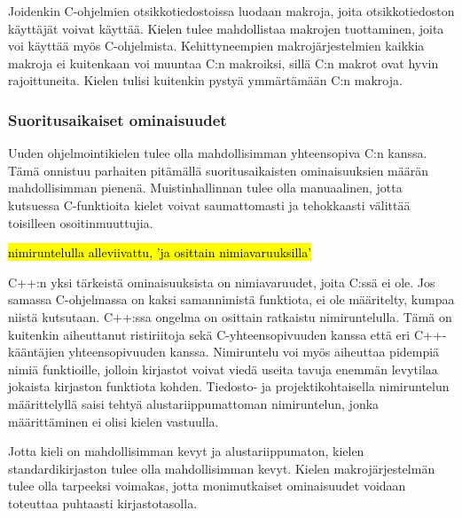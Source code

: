 Joidenkin C-ohjelmien otsikkotiedostoissa luodaan makroja, joita
otsikkotiedoston käyttäjät voivat käyttää. Kielen tulee mahdollistaa makrojen
tuottaminen, joita voi käyttää myös C-ohjelmista. Kehittyneempien
makrojärjestelmien kaikkia makroja ei kuitenkaan voi muuntaa C:n makroiksi,
sillä C:n makrot ovat hyvin rajoittuneita. Kielen tulisi kuitenkin pystyä
ymmärtämään C:n makroja.

\subsubsection{Suoritusaikaiset ominaisuudet}

Uuden ohjelmointikielen tulee olla mahdollisimman yhteensopiva C:n kanssa. Tämä
onnistuu parhaiten pitämällä suoritusaikaisten ominaisuuksien määrän mahdollisimman
pienenä. Muistinhallinnan tulee olla manuaalinen, jotta kutsuessa C-funktioita
kielet voivat saumattomasti ja tehokkaasti välittää toisilleen
osoitinmuuttujia.


\hl{nimiruntelulla alleviivattu, 'ja osittain nimiavaruuksilla'}

C++:n yksi tärkeistä ominaisuuksista on nimiavaruudet, joita C:ssä ei ole. Jos
samassa C-ohjelmassa on kaksi samannimistä funktiota, ei ole määritelty, kumpaa
niistä kutsutaan. C++:ssa ongelma on osittain ratkaistu nimiruntelulla. Tämä on
kuitenkin aiheuttanut ristiriitoja sekä C-yhteensopivuuden kanssa että eri
C++-kääntäjien yhteensopivuuden kanssa. Nimiruntelu voi myös aiheuttaa pidempiä
nimiä funktioille, jolloin kirjastot voivat viedä useita tavuja enemmän
levytilaa jokaista kirjaston funktiota kohden. Tiedosto- ja projektikohtaisella
nimiruntelun määrittelyllä saisi tehtyä alustariippumattoman nimiruntelun,
jonka määrittäminen ei olisi kielen vastuulla.

Jotta kieli on mahdollisimman kevyt ja alustariippumaton, kielen
standardikirjaston tulee olla mahdollisimman kevyt. Kielen makrojärjestelmän
tulee olla tarpeeksi voimakas, jotta monimutkaiset ominaisuudet voidaan
toteuttaa puhtaasti kirjastotasolla.

